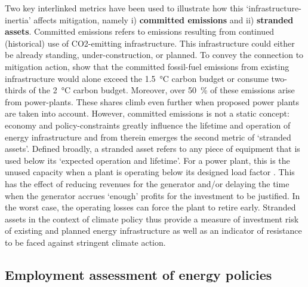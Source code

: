 \documentclass[../thesis.tex]{subfiles}
\begin{document}
Two key interlinked metrics have been used to illustrate how this `infrastructure-inertia' \citep{davis2010future} affects mitigation, namely i) \textbf{committed emissions} and ii) \textbf{stranded assets}. Committed emissions refers to emissions resulting from continued (historical) use of CO2-emitting infrastructure. This infrastructure could either be already standing, under-construction, or planned. To convey the connection to mitigation action, \citet{tong2019committed} show that the committed fossil-fuel emissions from existing infrastructure  would alone exceed the \SI{1.5}{\degreeCelsius} carbon budget or consume two-thirds of the \SI{2}{\degreeCelsius} carbon budget. Moreover, over \SI{50}{\percent} of these emissions arise from power-plants. These shares climb even further when proposed power plants are taken into account. However, committed emissions is not a static concept: economy and policy-constraints greatly influence the lifetime and operation of energy infrastructure and from therein emerges the second metric of `stranded assets'. Defined broadly, a stranded asset refers to any piece of equipment that is used below its `expected operation and lifetime'. For a power plant, this is the unused capacity when a plant is operating below its designed load factor \citep{johnson2015}. This has the effect of reducing revenues for the generator and/or delaying the time when the generator accrues `enough' profits for the investment to be justified. In the worst case, the operating losses can force the plant to retire early. Stranded assets in the context of climate policy thus provide a measure of investment risk of existing and planned energy infrastructure as well as an indicator of resistance to be faced against stringent climate action.


\subsection{Employment assessment of energy policies} \label{sec:employment}
\end{document}
